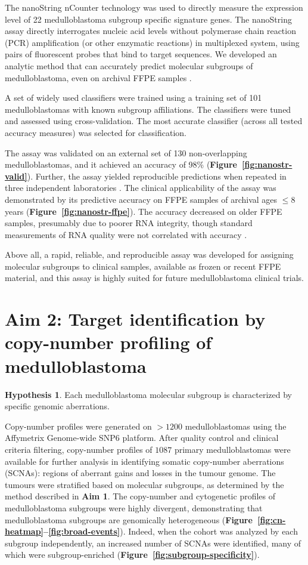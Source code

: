 \documentclass[11pt,letterpaper]{article}
\theoremstyle{definition}
\newtheorem*{hypothesis}{Hypothesis}
\begin{document}
The nanoString nCounter technology  was used to directly measure the expression level of 22 medulloblastoma subgroup specific signature genes. The nanoString assay directly interrogates nucleic acid levels without polymerase chain reaction (PCR) amplification (or other enzymatic reactions) in multiplexed system, using pairs of fluorescent probes that bind to target sequences. We developed an analytic method that can accurately predict molecular subgroups of medulloblastoma, even on archival FFPE samples .

A set of widely used classifiers were trained using a training set of 101 medulloblastomas with known subgroup affiliations. The classifiers were tuned and assessed using cross-validation. The most accurate classifier (across all tested accuracy measures) was selected for classification.

The assay was validated on an external set of 130 non-overlapping medulloblastomas, and it achieved an accuracy of 98\% (\textbf{Figure~\ref{fig:nanostr-valid}}). Further, the assay yielded reproducible predictions when repeated in three independent laboratories . The clinical applicability of the assay was demonstrated by its predictive accuracy on FFPE samples of archival ages $\leq 8$ years (\textbf{Figure~\ref{fig:nanostr-ffpe}}). The accuracy decreased on older FFPE samples, presumably due to poorer RNA integrity, though standard measurements of RNA quality were not correlated with accuracy .

Above all, a rapid, reliable, and reproducible assay was developed for assigning molecular subgroups to clinical samples, available as frozen or recent FFPE material, and this assay is highly suited for future medulloblastoma clinical trials.

\section{Aim 2: Target identification by copy-number profiling of medulloblastoma}

\begin{hypothesis}
Each medulloblastoma molecular subgroup is characterized by specific genomic aberrations.
\end{hypothesis}

Copy-number profiles were generated on $> 1200$ medulloblastomas using the Affymetrix Genome-wide SNP6 platform. After quality control and clinical criteria filtering, copy-number profiles of $1087$ primary medulloblastomas were available for further analysis in identifying somatic copy-number aberrations (SCNAs): regions of aberrant gains and losses in the tumour genome. The tumours were stratified based on molecular subgroups, as determined by the method described in \textbf{Aim 1}. The copy-number and cytogenetic profiles of medulloblastoma subgroups were highly divergent, demonstrating that medulloblastoma subgroups are genomically heterogeneous (\textbf{Figure~\ref{fig:cn-heatmap}--\ref{fig:broad-events}}). Indeed, when the cohort was analyzed by each subgroup independently, an increased number of SCNAs were identified, many of which were subgroup-enriched (\textbf{Figure~\ref{fig:subgroup-specificity}}).
\end{document}
